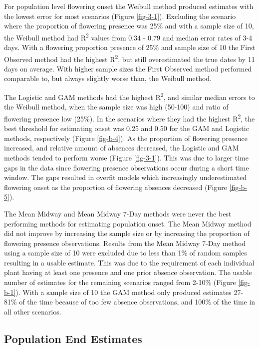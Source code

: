 For population level flowering onset the Weibull method produced estimates with the lowest error for most scenarios (Figure \ref{fig-3-1}). Excluding the scenario where the proportion of flowering presence was 25\% and with a sample size of 10, the Weibull method had R\textsuperscript{2} values from 0.34 - 0.79 and median error rates of 3-4 days. With a flowering proportion presence of 25\% and sample size of 10 the First Observed method had the highest R\textsuperscript{2}, but still overestimated the true dates by 11 days on average. With higher sample sizes the First Observed method performed comparable to, but always slightly worse than, the Weibull method.

The Logistic and GAM methods had the highest R\textsuperscript{2}, and similar median errors to the Weibull method, when the sample size was high (50-100) and ratio of flowering presence low (25\%). In the scenarios where they had the highest R\textsuperscript{2}, the best threshold for estimating onset was 0.25 and 0.50 for the GAM and Logistic methods, respectively (Figure \ref{fig-b-4}). As the proportion of flowering presence increased, and relative amount of absences decreased, the Logistic and GAM methods tended to perform worse (Figure \ref{fig-3-1}). This was due to larger time gaps in the data since flowering presence observations occur during a short time window. The gaps resulted in overfit models which increasingly underestimated flowering onset as the proportion of flowering absences decreased (Figure \ref{fig-b-5}).

The Mean Midway and Mean Midway 7-Day methods were never the best performing methods for estimating population onset. The Mean Midway method did not improve by increasing the sample size or by increasing the proportion of flowering presence observations. Results from the Mean Midway 7-Day method using a sample size of 10 were excluded due to less than 1\% of random samples resulting in a usable estimate. This was due to the requirement of each individual plant having at least one presence and one prior absence observation. The usable number of estimates for the remaining scenarios ranged from 2-10\% (Figure \ref{fig-b-1}). With a sample size of 10 the GAM method only produced estimates 27-81\% of the time because of too few absence observations, and 100\% of the time in all other scenarios. 

\subsection{Population End Estimates}


